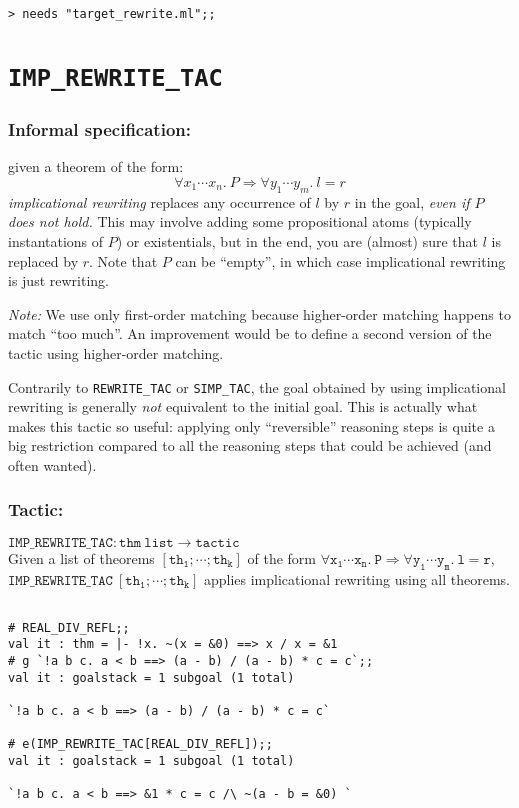 \documentclass{llncs}
\newcommand*\IMPREWRITETAC{\texttt{IMP\_REWRITE\_TAC}\xspace}
\newcommand*\REWRITETAC{\texttt{REWRITE\_TAC}\xspace}
\newcommand*\SIMPTAC{\texttt{SIMP\_TAC}\xspace}
\begin{document}
		\bigskip
    \texttt{> needs "target\_rewrite.ml";;}

	\section{\IMPREWRITETAC}
		\subsubsection{Informal specification:}
		given a theorem of the form:
    \[\forall x_1\cdots x_n.\ P \Rightarrow \forall y_1\cdots y_m.\ l = r\]
    \emph{implicational rewriting} replaces any occurrence of $l$ by $r$
    in the goal, \emph{even if $P$ does not hold.}
		This may involve adding some propositional atoms (typically instantations of $P$) or existentials,
    but in the end, you are (almost) sure that $l$ is replaced by $r$.
    Note that $P$ can be ``empty'', in which case implicational rewriting is just rewriting.

    \emph{Note:} We use only first-order matching because higher-order matching happens to match ``too much''.
    An improvement would be to define a second version of the tactic using higher-order matching.

    \begin{remark}
      Contrarily to \REWRITETAC or \SIMPTAC, the goal obtained by using implicational rewriting is generally 
      \emph{not} equivalent to the initial goal. This is actually what makes this tactic so useful:
      applying only ``reversible'' reasoning steps is quite a big restriction compared to all the
      reasoning steps that could be achieved (and often wanted).
    \end{remark}

		\subsubsection{Tactic:}
		$\mathtt{\IMPREWRITETAC: thm\ list \to tactic}$\\
    Given a list of theorems $\mathtt{[th_1;\cdots;th_k]}$
    of the form $\mathtt{\forall x_1\cdots x_n.\ P \Rightarrow \forall y_1\cdots y_m.\ l = r}$,
		$\mathtt{\IMPREWRITETAC\ [th_1;\cdots;th_k]}$ applies implicational rewriting using all theorems.

    \begin{example}
      \label{ex:imp_rewrite_tac}
    \begin{verbatim}

# REAL_DIV_REFL;;
val it : thm = |- !x. ~(x = &0) ==> x / x = &1
# g `!a b c. a < b ==> (a - b) / (a - b) * c = c`;;
val it : goalstack = 1 subgoal (1 total)

`!a b c. a < b ==> (a - b) / (a - b) * c = c`

# e(IMP_REWRITE_TAC[REAL_DIV_REFL]);;
val it : goalstack = 1 subgoal (1 total)

`!a b c. a < b ==> &1 * c = c /\ ~(a - b = &0) ` \end{verbatim}
    \end{example}
    
\end{document}
